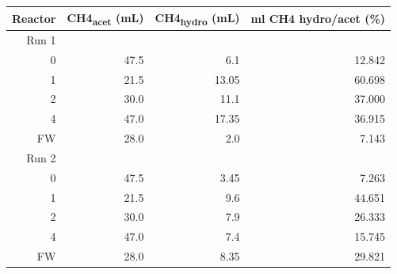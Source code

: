 \documentclass[11pt]{article}
\begin{document}
\begin{center}
\begin{tabular}{rrrr}
Reactor & CH4\textsubscript{acet} (mL) & CH4\textsubscript{hydro} (mL) & ml CH4 hydro/acet (\%)\\[0pt]
\hline
Run 1 &  &  & \\[0pt]
\hline
0 & 47.5 & 6.1 & 12.842\\[0pt]
1 & 21.5 & 13.05 & 60.698\\[0pt]
2 & 30.0 & 11.1 & 37.000\\[0pt]
4 & 47.0 & 17.35 & 36.915\\[0pt]
FW & 28.0 & 2.0 & 7.143\\[0pt]
\hline
Run 2 &  &  & \\[0pt]
\hline
0 & 47.5 & 3.45 & 7.263\\[0pt]
1 & 21.5 & 9.6 & 44.651\\[0pt]
2 & 30.0 & 7.9 & 26.333\\[0pt]
4 & 47.0 & 7.4 & 15.745\\[0pt]
FW & 28.0 & 8.35 & 29.821\\[0pt]
\hline
\end{tabular}
\end{center}
\end{document}
